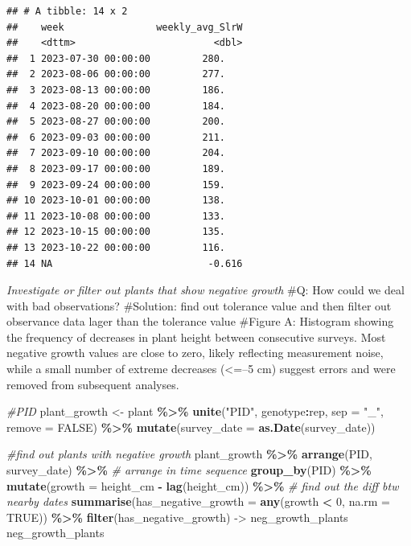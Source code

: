 \documentclass[
]{article}
\newenvironment{Shaded}{\begin{snugshade}}{\end{snugshade}}
\newcommand{\AttributeTok}[1]{\textcolor[rgb]{0.13,0.29,0.53}{#1}}
\newcommand{\CommentTok}[1]{\textcolor[rgb]{0.56,0.35,0.01}{\textit{#1}}}
\newcommand{\ConstantTok}[1]{\textcolor[rgb]{0.56,0.35,0.01}{#1}}
\newcommand{\DecValTok}[1]{\textcolor[rgb]{0.00,0.00,0.81}{#1}}
\newcommand{\FunctionTok}[1]{\textcolor[rgb]{0.13,0.29,0.53}{\textbf{#1}}}
\newcommand{\NormalTok}[1]{#1}
\newcommand{\OtherTok}[1]{\textcolor[rgb]{0.56,0.35,0.01}{#1}}
\newcommand{\SpecialCharTok}[1]{\textcolor[rgb]{0.81,0.36,0.00}{\textbf{#1}}}
\newcommand{\StringTok}[1]{\textcolor[rgb]{0.31,0.60,0.02}{#1}}
\begin{document}
\begin{verbatim}
## # A tibble: 14 x 2
##    week                weekly_avg_SlrW
##    <dttm>                        <dbl>
##  1 2023-07-30 00:00:00         280.   
##  2 2023-08-06 00:00:00         277.   
##  3 2023-08-13 00:00:00         186.   
##  4 2023-08-20 00:00:00         184.   
##  5 2023-08-27 00:00:00         200.   
##  6 2023-09-03 00:00:00         211.   
##  7 2023-09-10 00:00:00         204.   
##  8 2023-09-17 00:00:00         189.   
##  9 2023-09-24 00:00:00         159.   
## 10 2023-10-01 00:00:00         138.   
## 11 2023-10-08 00:00:00         133.   
## 12 2023-10-15 00:00:00         135.   
## 13 2023-10-22 00:00:00         116.   
## 14 NA                           -0.616
\end{verbatim}

\emph{Investigate or filter out plants that show negative growth} \#Q:
How could we deal with bad observations? \#Solution: find out tolerance
value and then filter out observance data lager than the tolerance value
\#Figure A: Histogram showing the frequency of decreases in plant height
between consecutive surveys. Most negative growth values are close to
zero, likely reflecting measurement noise, while a small number of
extreme decreases (\textless=--5 cm) suggest errors and were removed
from subsequent analyses.

\begin{Shaded}
\begin{Highlighting}[]
\CommentTok{\#PID}
\NormalTok{plant\_growth }\OtherTok{\textless{}{-}}\NormalTok{ plant }\SpecialCharTok{\%\textgreater{}\%}
  \FunctionTok{unite}\NormalTok{(}\StringTok{"PID"}\NormalTok{, genotype}\SpecialCharTok{:}\NormalTok{rep, }\AttributeTok{sep =} \StringTok{"\_"}\NormalTok{, }\AttributeTok{remove =} \ConstantTok{FALSE}\NormalTok{) }\SpecialCharTok{\%\textgreater{}\%}
  \FunctionTok{mutate}\NormalTok{(}\AttributeTok{survey\_date =} \FunctionTok{as.Date}\NormalTok{(survey\_date))}

\CommentTok{\#find out plants with negative growth}
\NormalTok{plant\_growth }\SpecialCharTok{\%\textgreater{}\%}
  \FunctionTok{arrange}\NormalTok{(PID, survey\_date) }\SpecialCharTok{\%\textgreater{}\%}  \CommentTok{\# arrange in time sequence}
  \FunctionTok{group\_by}\NormalTok{(PID) }\SpecialCharTok{\%\textgreater{}\%}
  \FunctionTok{mutate}\NormalTok{(}\AttributeTok{growth =}\NormalTok{ height\_cm }\SpecialCharTok{{-}} \FunctionTok{lag}\NormalTok{(height\_cm)) }\SpecialCharTok{\%\textgreater{}\%}  \CommentTok{\# find out the diff btw nearby dates}
  \FunctionTok{summarise}\NormalTok{(}\AttributeTok{has\_negative\_growth =} \FunctionTok{any}\NormalTok{(growth }\SpecialCharTok{\textless{}} \DecValTok{0}\NormalTok{, }\AttributeTok{na.rm =} \ConstantTok{TRUE}\NormalTok{)) }\SpecialCharTok{\%\textgreater{}\%} 
  \FunctionTok{filter}\NormalTok{(has\_negative\_growth) }\OtherTok{{-}\textgreater{}}\NormalTok{ neg\_growth\_plants}
\NormalTok{neg\_growth\_plants}
\end{Highlighting}
\end{Shaded}
\end{document}
